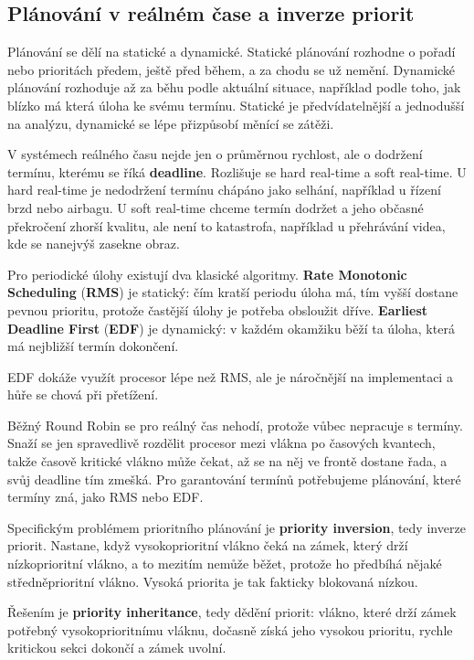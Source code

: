 \documentclass[11pt,a4paper]{article}
\begin{document}
\subsection*{Plánování v reálném čase a inverze priorit}

Plánování se dělí na statické a dynamické. Statické plánování rozhodne o pořadí nebo prioritách předem, ještě před během, a za chodu se už nemění. Dynamické plánování rozhoduje až za běhu podle aktuální situace, například podle toho, jak blízko má která úloha ke svému termínu. Statické je předvídatelnější a jednodušší na analýzu, dynamické se lépe přizpůsobí měnící se zátěži.

V systémech reálného času nejde jen o průměrnou rychlost, ale o dodržení termínu, kterému se říká \textbf{deadline}. Rozlišuje se hard real-time a soft real-time. U hard real-time je nedodržení termínu chápáno jako selhání, například u řízení brzd nebo airbagu. U soft real-time chceme termín dodržet a jeho občasné překročení zhorší kvalitu, ale není to katastrofa, například u přehrávání videa, kde se nanejvýš zasekne obraz.

Pro periodické úlohy existují dva klasické algoritmy. \textbf{Rate Monotonic Scheduling} (\textbf{RMS}) je statický: čím kratší periodu úloha má, tím vyšší dostane pevnou prioritu, protože častější úlohy je potřeba obsloužit dříve. \textbf{Earliest Deadline First} (\textbf{EDF}) je dynamický: v každém okamžiku běží ta úloha, která má nejbližší termín dokončení.

EDF dokáže využít procesor lépe než RMS, ale je náročnější na implementaci a hůře se chová při přetížení.

Běžný Round Robin se pro reálný čas nehodí, protože vůbec nepracuje s termíny. Snaží se jen spravedlivě rozdělit procesor mezi vlákna po časových kvantech, takže časově kritické vlákno může čekat, až se na něj ve frontě dostane řada, a svůj deadline tím zmešká. Pro garantování termínů potřebujeme plánování, které termíny zná, jako RMS nebo EDF.

Specifickým problémem prioritního plánování je \textbf{priority inversion}, tedy inverze priorit. Nastane, když vysokoprioritní vlákno čeká na zámek, který drží nízkoprioritní vlákno, a to mezitím nemůže běžet, protože ho předbíhá nějaké středněprioritní vlákno. Vysoká priorita je tak fakticky blokovaná nízkou.

Řešením je \textbf{priority inheritance}, tedy dědění priorit: vlákno, které drží zámek potřebný vysokoprioritnímu vláknu, dočasně získá jeho vysokou prioritu, rychle kritickou sekci dokončí a zámek uvolní.
\end{document}
